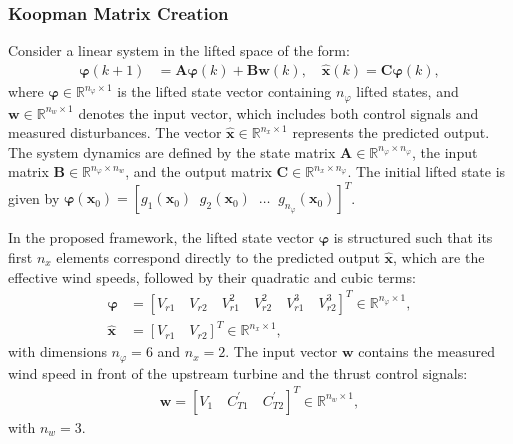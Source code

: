\subsubsection{Koopman Matrix Creation}

Consider a linear system in the lifted space of the form:
\begin{align}
    \bm{\varphi}(k+1) &= \bm{A} \bm{\varphi}(k) + \bm{B} \bm{w}(k), 
    \quad \hat{\bm{x}}(k) = \bm{C} \bm{\varphi}(k), 
    \label{eq:linearPredictor}
\end{align}
where $\bm{\varphi} \in \mathbb{R}^{n_\varphi \times 1}$ is the lifted state vector containing $n_\varphi$ lifted states, and $\bm{w} \in \mathbb{R}^{n_w \times 1}$ denotes the input vector, which includes both control signals and measured disturbances. The vector $\hat{\bm{x}} \in \mathbb{R}^{n_x \times 1}$ represents the predicted output. The system dynamics are defined by the state matrix $\bm{A} \in \mathbb{R}^{n_\varphi \times n_\varphi}$, the input matrix $\bm{B} \in \mathbb{R}^{n_\varphi \times n_w}$, and the output matrix $\bm{C} \in \mathbb{R}^{n_x \times n_\varphi}$. The initial lifted state is given by $\bm{\varphi}(\bm{x}_0) = [g_{1}(\bm{x}_0)\;\; g_{2}(\bm{x}_0) \;\; \ldots\;\;g_{n_\varphi}(\bm{x}_0)]^T$.

In the proposed framework, the lifted state vector $\bm{\varphi}$ is structured such that its first $n_x$ elements correspond directly to the predicted output $\hat{\bm{x}}$, which are the effective wind speeds, followed by their quadratic and cubic terms:
\begin{align*}
    \bm{\varphi} &= [V_{r1} \quad V_{r2} \quad V^2_{r1} \quad V^2_{r2} \quad  V^3_{r1} \quad V^3_{r2}]^T   \in \mathbb{R}^{n_\varphi \times 1}, \\
    \hat{\bm{x}} &=  [V_{r1} \quad V_{r2}] ^T   \in \mathbb{R}^{n_x \times 1},
\end{align*}
with dimensions $n_\varphi = 6$ and $n_x = 2$. The input vector $\bm{w}$ contains the measured wind speed in front of the upstream turbine and the thrust control signals:
\begin{align*}
    \bm{w} = [V_1 \quad C^{\prime}_{T1} \quad C^{\prime}_{T2}]^T   \in \mathbb{R}^{n_w \times 1},
\end{align*}
with $n_w = 3$.

